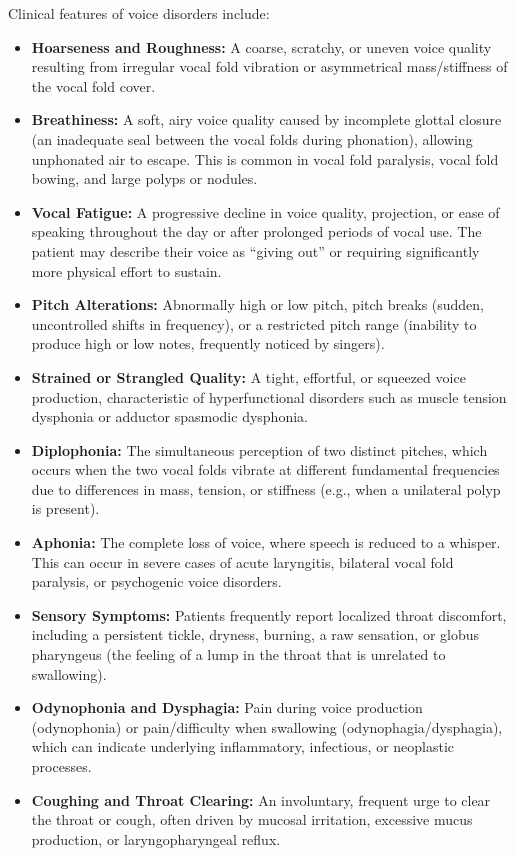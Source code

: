 Clinical features of voice disorders include:
\begin{itemize}
    \item \textbf{Hoarseness and Roughness:} A coarse, scratchy, or uneven voice quality resulting from irregular vocal fold vibration or asymmetrical mass/stiffness of the vocal fold cover.
    \item \textbf{Breathiness:} A soft, airy voice quality caused by incomplete glottal closure (an inadequate seal between the vocal folds during phonation), allowing unphonated air to escape. This is common in vocal fold paralysis, vocal fold bowing, and large polyps or nodules.
    \item \textbf{Vocal Fatigue:} A progressive decline in voice quality, projection, or ease of speaking throughout the day or after prolonged periods of vocal use. The patient may describe their voice as ``giving out'' or requiring significantly more physical effort to sustain.
    \item \textbf{Pitch Alterations:} Abnormally high or low pitch, pitch breaks (sudden, uncontrolled shifts in frequency), or a restricted pitch range (inability to produce high or low notes, frequently noticed by singers).
    \item \textbf{Strained or Strangled Quality:} A tight, effortful, or squeezed voice production, characteristic of hyperfunctional disorders such as muscle tension dysphonia or adductor spasmodic dysphonia.
    \item \textbf{Diplophonia:} The simultaneous perception of two distinct pitches, which occurs when the two vocal folds vibrate at different fundamental frequencies due to differences in mass, tension, or stiffness (e.g., when a unilateral polyp is present).
    \item \textbf{Aphonia:} The complete loss of voice, where speech is reduced to a whisper. This can occur in severe cases of acute laryngitis, bilateral vocal fold paralysis, or psychogenic voice disorders.
    \item \textbf{Sensory Symptoms:} Patients frequently report localized throat discomfort, including a persistent tickle, dryness, burning, a raw sensation, or globus pharyngeus (the feeling of a lump in the throat that is unrelated to swallowing).
    \item \textbf{Odynophonia and Dysphagia:} Pain during voice production (odynophonia) or pain/difficulty when swallowing (odynophagia/dysphagia), which can indicate underlying inflammatory, infectious, or neoplastic processes.
    \item \textbf{Coughing and Throat Clearing:} An involuntary, frequent urge to clear the throat or cough, often driven by mucosal irritation, excessive mucus production, or laryngopharyngeal reflux.
\end{itemize}

